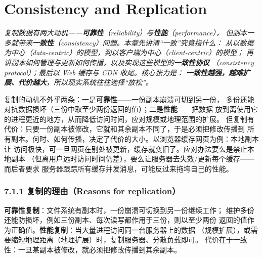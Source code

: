 \chapter{Consistency and Replication}
\begin{center}
\begin{minipage}{0.9\textwidth}
\itshape\small\color{dsgray}
复制数据有两大动机——\textbf{可靠性}（reliability）与\textbf{性能}（performance），
但副本一多就带来\textbf{一致性}（consistency）问题。本章先讲清“一致”究竟指什么：
从以数据为中心（data-centric）的模型，到以客户端为中心（client-centric）的模型；
再讲副本如何管理与更新如何传播，以及实现这些模型的\textbf{一致性协议}
（consistency protocol）；最后以 Web 缓存与 CDN 收尾。核心张力是：
\textbf{一致性越强，越难扩展、代价越大}，所以现实系统往往选择“放松”。
\end{minipage}
\end{center}


复制的动机不外乎两条：一是\textbf{可靠性}——一份副本崩溃可切到另一份，
多份还能对抗数据损坏（三份中取至少两份返回的值）；二是\textbf{性能}——把数据
放到离使用它的进程更近的地方，从而降低访问时间，应对规模或地理范围的扩展。
但复制有代价：只要一份副本被修改，它就和其余副本不同了，于是必须把修改传播到
所有副本。何时、如何传播，决定了代价的大小。以浏览器缓存网页为例：本地副本让
访问极快，可一旦网页在别处被更新，缓存就变旧了。应对办法要么是禁止本地副本
（但离用户远时访问时间仍差），要么让服务器去失效/更新每个缓存——而后者要求
服务器跟踪所有缓存并发消息，可能反过来拖垮自己的性能。

\subsection*{7.1.1 复制的理由（Reasons for replication）}
\textbf{可靠性复制}：文件系统有副本时，一份崩溃可切换到另一份继续工作；
维护多份还能防损坏，例如三份副本、每次读写都作用于三份，则以至少两份
返回的值作为正确值。\textbf{性能复制}：当大量进程访问同一台服务器上的数据
（规模扩展），或需要缩短地理距离（地理扩展）时，复制服务器、分散负载即可。
代价在于一致性：一旦某副本被修改，就必须把修改传播到其余副本。

\begin{closeread}
\end{closeread}

